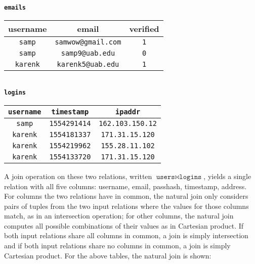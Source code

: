 \begin{center}
  \textbf{\texttt{emails}} \vspace{0.05cm} \\
  \begin{tabular}{ | c | c | c | }
    \hline
    \textbf{username} & \textbf{email} & \textbf{verified} \\
    \hline
    \texttt{samp} & \texttt{samwow@gmail.com} & \texttt{1} \\ \hline
    \texttt{samp} & \texttt{samp9@uab.edu} & \texttt{0} \\ \hline
    \texttt{karenk} & \texttt{karenk5@uab.edu} & \texttt{1} \\ \hline
  \end{tabular}
  \vspace{0.3cm} \\
  \textbf{\texttt{logins}} \vspace{0.05cm} \\
  \begin{tabular}{ | c | c | c | }
    \hline
    \textbf{\texttt{username}} & \textbf{\texttt{timestamp}} & \textbf{\texttt{ipaddr}} \\
    \hline
    \texttt{samp} & \texttt{1554291414} & \texttt{162.103.150.12} \\ \hline
    \texttt{karenk} & \texttt{1554181337} & \texttt{171.31.15.120} \\ \hline
    \texttt{karenk} & \texttt{1554219962} & \texttt{155.28.11.102} \\ \hline
    \texttt{karenk} & \texttt{1554133720} & \texttt{171.31.15.120} \\ \hline
  \end{tabular}
\end{center}

A join operation on these two relations, written $\texttt{users} \bowtie \texttt{logins}$,
yields a single relation with all five columns: username, email, passhash, timestamp, address. For columns the two relations have in common, the natural join only considers pairs of tuples from the two input relations where the values for those columns match, as in an intersection operation; for other columns, the natural join computes all possible combinations of their values as in Cartesian product. If both input relations share all columns in common, a join is simply intersection and if both input relations share no columns in common, a join is simply Cartesian product. For the above tables, the natural join is shown:

